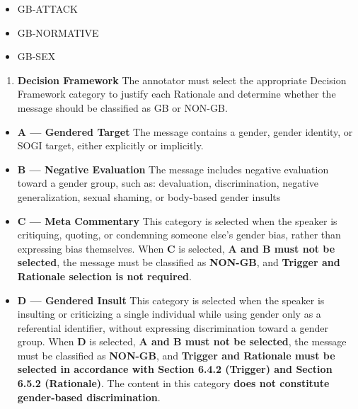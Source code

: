 \documentclass[12pt,oneside,openright,a4paper]{cpe-english-project}
\begin{document}
\begin{itemize}
\setlength{\itemsep}{0.15\baselineskip}
\setlength{\parsep}{0pt}
\setlength{\parskip}{0pt}
\item
  GB-ATTACK
\item
  GB-NORMATIVE
\item
  GB-SEX
\end{itemize}

\begin{enumerate}
\setlength{\itemsep}{0.15\baselineskip}
\setlength{\parsep}{0pt}
\setlength{\parskip}{0pt}
\def\labelenumi{\arabic{enumi})}
\setcounter{enumi}{3}
\item
  \textbf{Decision Framework}
  The annotator must select the appropriate Decision Framework category
  to justify each Rationale and determine whether the message should be
  classified as GB or NON-GB.
\end{enumerate}

\begin{itemize}
\setlength{\itemsep}{0.15\baselineskip}
\setlength{\parsep}{0pt}
\setlength{\parskip}{0pt}
\item
  \textbf{A --- Gendered Target}
  The message contains a gender, gender identity, or SOGI target, either
  explicitly or implicitly.
\item
  \textbf{B --- Negative Evaluation}
  The message includes negative evaluation toward a gender group, such
  as: devaluation, discrimination, negative generalization, sexual
  shaming, or body-based gender insults
\item
  \textbf{C --- Meta Commentary}
  This category is selected when the speaker is critiquing, quoting, or
  condemning someone else's gender bias, rather than expressing bias
  themselves. When \textbf{C} is selected, \textbf{A and B must not be
  selected}, the message must be classified as \textbf{NON-GB}, and
  \textbf{Trigger and Rationale selection is not required}.
\item
  \textbf{D --- Gendered Insult}
  This category is selected when the speaker is insulting or criticizing
  a single individual while using gender only as a referential
  identifier, without expressing discrimination toward a gender group.
  When \textbf{D} is selected, \textbf{A and B must not be selected},
  the message must be classified as \textbf{NON-GB}, and \textbf{Trigger
  and Rationale must be selected in accordance with Section 6.4.2
  (Trigger) and Section 6.5.2 (Rationale)}. The content in this category
  \textbf{does not constitute gender-based discrimination}.
\end{itemize}
\end{document}
